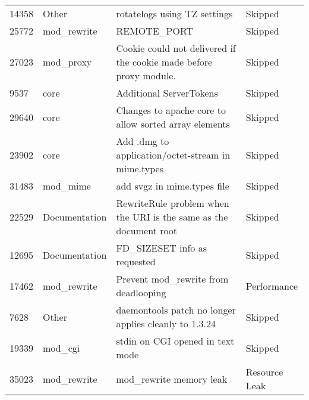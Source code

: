 \begin{longtable}[c]{p{1cm}p{3cm}p{6cm}p{4cm}}
14358  & Other              & rotatelogs using TZ settings                                                                                   & Skipped           \\
25772  & mod\_rewrite       & REMOTE\_PORT                                                                                                   & Skipped           \\
27023  & mod\_proxy         & Cookie could not delivered if the cookie made before proxy module.                                             & Skipped           \\
9537   & core               & Additional ServerTokens                                                                                        & Skipped           \\
29640  & core               & Changes to apache core to allow sorted array elements                                                          & Skipped           \\
23902  & core               & Add .dmg to application/octet-stream in mime.types                                                             & Skipped           \\
31483  & mod\_mime          & add svgz in mime.types file                                                                                    & Skipped           \\
22529  & Documentation      & RewriteRule problem when the URI is the same as the document root                                              & Skipped           \\
12695  & Documentation      & FD\_SIZESET info as requested                                                                                  & Skipped           \\
17462  & mod\_rewrite       & Prevent mod\_rewrite from deadlooping                                                                          & Performance       \\
7628   & Other              & daemontools patch no longer applies cleanly to 1.3.24                                                          & Skipped           \\
19339  & mod\_cgi           & stdin on CGI opened in text mode                                                                               & Skipped           \\
35023  & mod\_rewrite       & mod\_rewrite memory leak                                                                                       & Resource Leak    
\end{longtable}

